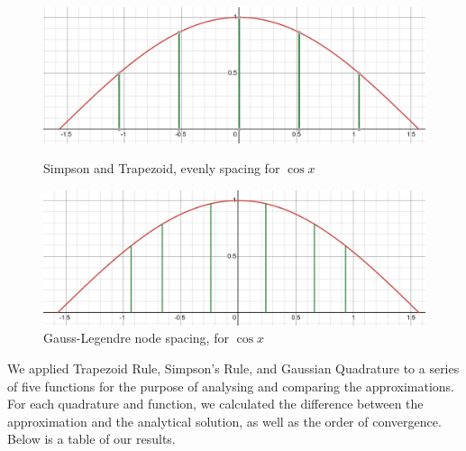 \documentclass[12pt]{article}
\begin{document}
% 


% 


% 
% 
\begin{figure}[htbp]
	\begin{minipage}[b]{0.45\textwidth}
		\centering
		\includegraphics[width=\textwidth]{../images/Evenly_spaced.png} %
		\caption{Simpson and Trapezoid, evenly spacing for $\cos x$}
	\end{minipage}
	\hfill
	\begin{minipage}[b]{0.45\textwidth}
		\centering
		\includegraphics[width=\textwidth]{../images/GuassianQuad.png} %
		\caption{Gauss-Legendre node spacing, for $\cos x$}
	\end{minipage}
\end{figure}

We applied Trapezoid Rule, Simpson's Rule, and Gaussian Quadrature to a series of five functions for the purpose of
analysing and comparing the approximations. For each quadrature and function, we calculated the difference between
the approximation and the analytical solution, as well as the order of convergence. Below is a table of our results.
\end{document}

